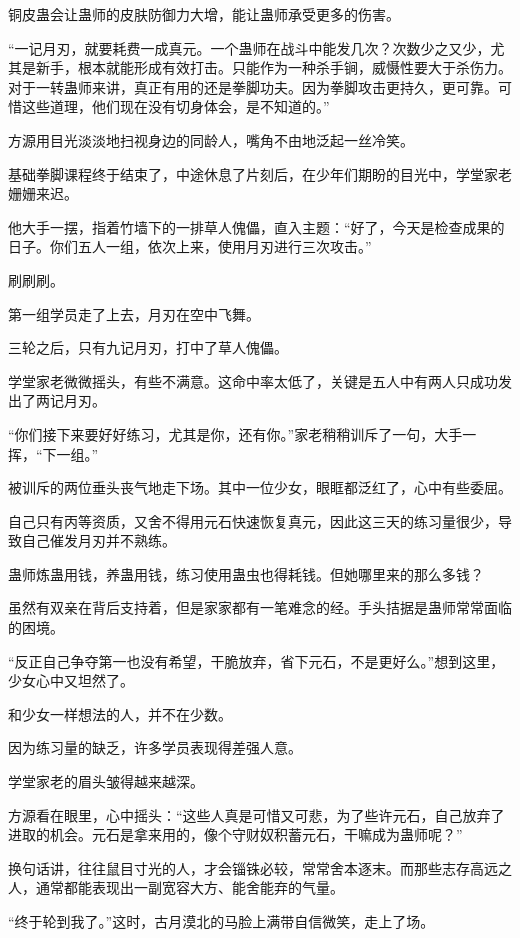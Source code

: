 \begin{this_body}
铜皮蛊会让蛊师的皮肤防御力大增，能让蛊师承受更多的伤害。

“一记月刃，就要耗费一成真元。一个蛊师在战斗中能发几次？次数少之又少，尤其是新手，根本就能形成有效打击。只能作为一种杀手锏，威慑性要大于杀伤力。对于一转蛊师来讲，真正有用的还是拳脚功夫。因为拳脚攻击更持久，更可靠。可惜这些道理，他们现在没有切身体会，是不知道的。”

方源用目光淡淡地扫视身边的同龄人，嘴角不由地泛起一丝冷笑。

基础拳脚课程终于结束了，中途休息了片刻后，在少年们期盼的目光中，学堂家老姗姗来迟。

他大手一摆，指着竹墙下的一排草人傀儡，直入主题：“好了，今天是检查成果的日子。你们五人一组，依次上来，使用月刃进行三次攻击。”

刷刷刷。

第一组学员走了上去，月刃在空中飞舞。

三轮之后，只有九记月刃，打中了草人傀儡。

学堂家老微微摇头，有些不满意。这命中率太低了，关键是五人中有两人只成功发出了两记月刃。

“你们接下来要好好练习，尤其是你，还有你。”家老稍稍训斥了一句，大手一挥，“下一组。”

被训斥的两位垂头丧气地走下场。其中一位少女，眼眶都泛红了，心中有些委屈。

自己只有丙等资质，又舍不得用元石快速恢复真元，因此这三天的练习量很少，导致自己催发月刃并不熟练。

蛊师炼蛊用钱，养蛊用钱，练习使用蛊虫也得耗钱。但她哪里来的那么多钱？

虽然有双亲在背后支持着，但是家家都有一笔难念的经。手头拮据是蛊师常常面临的困境。

“反正自己争夺第一也没有希望，干脆放弃，省下元石，不是更好么。”想到这里，少女心中又坦然了。

和少女一样想法的人，并不在少数。

因为练习量的缺乏，许多学员表现得差强人意。

学堂家老的眉头皱得越来越深。

方源看在眼里，心中摇头：“这些人真是可惜又可悲，为了些许元石，自己放弃了进取的机会。元石是拿来用的，像个守财奴积蓄元石，干嘛成为蛊师呢？”

换句话讲，往往鼠目寸光的人，才会锱铢必较，常常舍本逐末。而那些志存高远之人，通常都能表现出一副宽容大方、能舍能弃的气量。

“终于轮到我了。”这时，古月漠北的马脸上满带自信微笑，走上了场。


\end{this_body}

